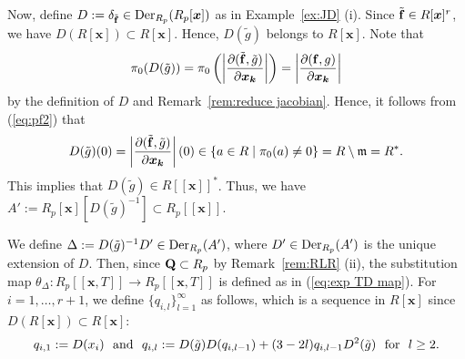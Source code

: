 \documentclass{amsart}
\theoremstyle{plain}
\theoremstyle{definition}
\newcommand{\fm }{{\mathfrak{m}}}
\newcommand{\Der }{\mathop{\rm Der}\nolimits}
\newcommand{\sm}{\setminus}
\newcommand{\Q}{{\bf Q}}
\newcommand{\x}{{\boldsymbol x}}
\newcommand{\bk}{{\boldsymbol k}}
\newcommand{\ff}{{\bf f}}
\newcommand{\Rx}{R[\x]}
\begin{document}
Now, 
define $D:=\delta _{\tilde{\ff }}\in \Der _{R_p}(R_p[\x ])$ 
as in Example~\ref{ex:JD} (i). 
Since $\tilde{\ff }\in \Rx ^r$, 
we have $D(\Rx )\subset \Rx $. 
Hence, $D(\tilde{g})$ belongs to $\Rx $. 
Note that 
\begin{equation}\label{eq:pf3}
\pi _0(D(\tilde{g}))=\pi _0
\left( 
\left|
\dfrac{\partial (\tilde{\ff },\tilde{g})}{\partial \x _{\bk }}
\right|
\right)
= \left|
\dfrac{\partial (\ff ,g)}{\partial \x _{\bk }}
\right| 
\end{equation}
by the definition of $D$ and Remark~\ref{rem:reduce jacobian}. 
Hence, it follows from (\ref{eq:pf2}) that 
\begin{equation}\label{eq:pf4}
D(\tilde{g})(0)=\left|
\dfrac{\partial (\tilde{\ff },\tilde{g})}{\partial \x _{\bk }}
\right|(0)
\in \{ a\in R\mid \pi _0(a)\ne 0\} =R\sm \fm =R^*. 
\end{equation}
This implies that $D(\tilde{g})\in R[[\x ]]^*$. 
Thus, we have $A':=R_p[\x ][D(\tilde{g})^{-1}]\subset R_p[[\x ]]$. 



We define $\Delta :=D(\tilde{g})^{-1}D'\in \Der _{R_p}(A')$, 
where $D'\in \Der _{R_p}(A')$ is the unique extension of $D$. 
Then, 
since $\Q \subset R_p$ by Remark~\ref{rem:RLR} (ii), 
the substitution map 
$\theta _{\Delta }:R_p[[\x ,T]]\to R_p[[\x ,T]]$ 
is defined 
as in (\ref{eq:exp TD map}). 
For $i=1,\ldots ,r+1$, 
we define $\{ q_{i,l}\} _{l=1}^{\infty }$ as follows, 
which is a sequence in $\Rx $ since $D(\Rx )\subset \Rx $: 
\begin{equation}\label{eq:def:hat{h}}
q_{i,1}:=D(x_i)\text{ \ and \ }
q_{i,l}:=D(\tilde{g})D(q_{i,l-1})+(3-2l)q_{i,l-1}D^2(\tilde{g})
\text{ \ for \ } l\ge 2. 
\end{equation}
\end{document}
